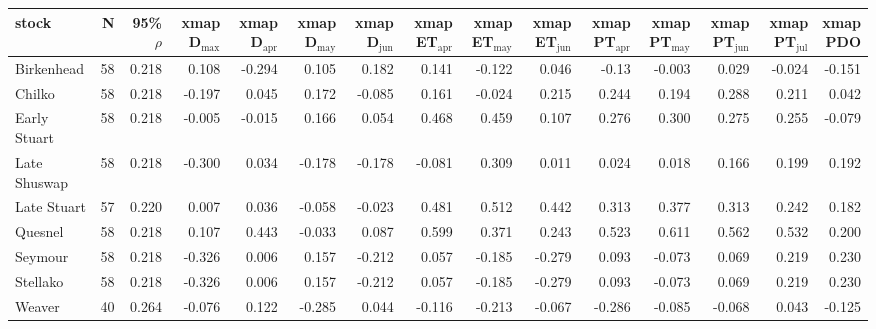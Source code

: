 \begin{tabular}{l|rr|rrrr|rrr|rrrr|r}
\hline
stock & N & 95\% $\rho$ & \specialcellR{xmap\\D$_\mathrm{max}$} & \specialcellR{xmap\\D$_\mathrm{apr}$} & \specialcellR{xmap\\D$_\mathrm{may}$} & \specialcellR{xmap\\D$_\mathrm{jun}$} & \specialcellR{xmap\\ET$_\mathrm{apr}$} & \specialcellR{xmap\\ET$_\mathrm{may}$} & \specialcellR{xmap\\ET$_\mathrm{jun}$} & \specialcellR{xmap\\PT$_\mathrm{apr}$} & \specialcellR{xmap\\PT$_\mathrm{may}$} & \specialcellR{xmap\\PT$_\mathrm{jun}$} & \specialcellR{xmap\\PT$_\mathrm{jul}$} & \specialcellR{xmap\\PDO} \\
\hline
Birkenhead & 58 & 0.218 & 0.108 & -0.294 & 0.105 & 0.182 & 0.141 & -0.122 & 0.046 & -0.13 & -0.003 & 0.029 & -0.024 & -0.151 \\
Chilko & 58 & 0.218 & -0.197 & 0.045 & 0.172 & -0.085 & 0.161 & -0.024 & 0.215 & 0.244 & 0.194 & 0.288 & 0.211 & 0.042 \\
Early Stuart & 58 & 0.218 & -0.005 & -0.015 & 0.166 & 0.054 & 0.468 & 0.459 & 0.107 & 0.276 & 0.300 & 0.275 & 0.255 & -0.079 \\
Late Shuswap & 58 & 0.218 & -0.300 & 0.034 & -0.178 & -0.178 & -0.081 & 0.309 & 0.011 & 0.024 & 0.018 & 0.166 & 0.199 & 0.192 \\
Late Stuart & 57 & 0.220 & 0.007 & 0.036 & -0.058 & -0.023 & 0.481 & 0.512 & 0.442 & 0.313 & 0.377 & 0.313 & 0.242 & 0.182 \\
Quesnel & 58 & 0.218 & 0.107 & 0.443 & -0.033 & 0.087 & 0.599 & 0.371 & 0.243 & 0.523 & 0.611 & 0.562 & 0.532 & 0.200 \\
Seymour & 58 & 0.218 & -0.326 & 0.006 & 0.157 & -0.212 & 0.057 & -0.185 & -0.279 & 0.093 & -0.073 & 0.069 & 0.219 & 0.230 \\
Stellako & 58 & 0.218 & -0.326 & 0.006 & 0.157 & -0.212 & 0.057 & -0.185 & -0.279 & 0.093 & -0.073 & 0.069 & 0.219 & 0.230 \\
Weaver & 40 & 0.264 & -0.076 & 0.122 & -0.285 & 0.044 & -0.116 & -0.213 & -0.067 & -0.286 & -0.085 & -0.068 & 0.043 & -0.125 \\ 
\hline
\end{tabular}